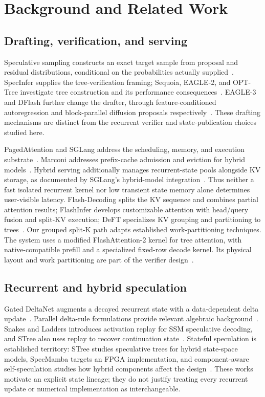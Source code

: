 \documentclass[conference]{IEEEtran}
\begin{document}
\section{Background and Related Work}
\label{sec:related}
\subsection{Drafting, verification, and serving}
Speculative sampling constructs an exact target sample from proposal and residual distributions, conditional on the probabilities actually supplied~\cite{leviathan2023fast,chen2023sampling}. SpecInfer supplies the tree-verification framing; Sequoia, EAGLE-2, and OPT-Tree investigate tree construction and its performance consequences~\cite{miao2023specinfer,chen2024sequoia,li2024eagle,wang2024opt}. EAGLE-3 and DFlash further change the drafter, through feature-conditioned autoregression and block-parallel diffusion proposals respectively~\cite{li2025eagle3,chen2026dflash}. These drafting mechanisms are distinct from the recurrent verifier and state-publication choices studied here.

PagedAttention and SGLang address the scheduling, memory, and execution substrate~\cite{kwon2023efficient,zheng2024sglang}. Marconi addresses prefix-cache admission and eviction for hybrid models~\cite{pan2024marconi}. Hybrid serving additionally manages recurrent-state pools alongside KV storage, as documented by SGLang's hybrid-model integration~\cite{pytorch2025sglang,sglang2026qwen}. Thus neither a fast isolated recurrent kernel nor low transient state memory alone determines user-visible latency. Flash-Decoding splits the KV sequence and combines partial attention results; FlashInfer develops customizable attention with head/query fusion and split-KV execution; DeFT specializes KV grouping and partitioning to trees~\cite{dao2023flashdecoding,ye2025flashinfer,yao2024deft}. Our grouped split-K path adapts established work-partitioning techniques. The system uses a modified FlashAttention-2 kernel for tree attention, with native-compatible prefill and a specialized fixed-row decode kernel. Its physical layout and work partitioning are part of the verifier design~\cite{dao2023flashattention,lumo2026archive}.

\subsection{Recurrent and hybrid speculation}
Gated DeltaNet augments a decayed recurrent state with a data-dependent delta update~\cite{yang2024gated}. Parallel delta-rule formulations provide relevant algebraic background~\cite{yang2024delta}. Snakes and Ladders introduces activation replay for SSM speculative decoding, and STree also uses replay to recover continuation state~\cite{wu2024snakes,wu2025stree}. Stateful speculation is established territory: STree studies speculative trees for hybrid state-space models, SpecMamba targets an FPGA implementation, and component-aware self-speculation studies how hybrid components affect the design~\cite{wu2025stree,zhong2025specmamba,borobia2026component}. These works motivate an explicit state lineage; they do not justify treating every recurrent update or numerical implementation as interchangeable.
\end{document}
